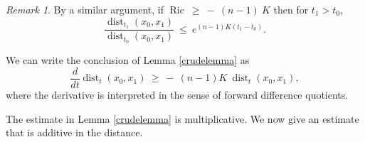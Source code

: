 \documentclass[12pt]{amsart}
\newcommand{\dist}{\operatorname{dist}}
\newcommand{\Ric}{\operatorname{Ric}}
\numberwithin{equation}{section}
\theoremstyle{plain}
\theoremstyle{definition}
\theoremstyle{remark}
\newtheorem{remark}[equation]{Remark}
\begin{document}
\begin{remark} \label{similar}
By a similar argument, if
$\Ric \: \ge \: - \: (n-1) \: K$ then for $t_1 > t_0$,
\begin{equation}
\frac{\dist_{t_1}(x_0, x_1)}{\dist_{t_0}(x_0, x_1)} \: \le \:
e^{(n-1)K(t_1-t_0)}.
\end{equation}
\end{remark}

We can write the conclusion of Lemma \ref{crudelemma} as
\begin{equation} \label{conclusion}
\frac{d}{dt} \dist_t(x_0, x_1) \: \ge \: - \: (n-1) K \:
\dist_t(x_0, x_1), 
\end{equation}
where the derivative is interpreted in the sense of forward difference quotients.

The estimate in Lemma \ref{crudelemma} is multiplicative. 
We now give an estimate that is additive in the distance.
\end{document}
